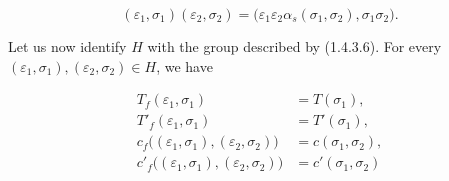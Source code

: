 \begin{equation}
  (\varepsilon_1,\sigma_1)(\varepsilon_2,\sigma_2)
  =\bigl(\varepsilon_1\varepsilon_2
    \alpha_s(\sigma_1,\sigma_2),\sigma_1\sigma_2\bigr).
  \tag{1.4.3.6}
\end{equation}

Let us now identify $H$ with the group described by (1.4.3.6). For
every $(\varepsilon_1,\sigma_1),(\varepsilon_2,\sigma_2)\in H$, we have

\begin{equation}
  \begin{aligned}
    T_f(\varepsilon_1,\sigma_1)&=T(\sigma_1),\\
    T'_f(\varepsilon_1,\sigma_1)&=T'(\sigma_1),\\
    c_f\bigl((\varepsilon_1,\sigma_1),(\varepsilon_2,\sigma_2)\bigr)
      &=c(\sigma_1,\sigma_2),\\
    c'_f\bigl((\varepsilon_1,\sigma_1),(\varepsilon_2,\sigma_2)\bigr)
      &=c'(\sigma_1,\sigma_2)
  \end{aligned}
  \tag{1.4.3.7}
\end{equation}
